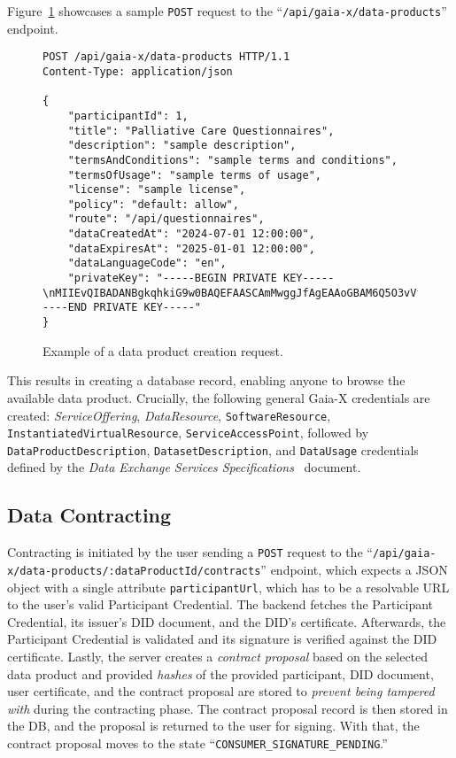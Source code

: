 Figure~\ref{fig:data_products_req} showcases a sample \texttt{POST} request to the ``\texttt{/api/gaia-x/data-products}'' endpoint.

\begin{figure}[h]
    \centering
    \begin{verbatim}
POST /api/gaia-x/data-products HTTP/1.1
Content-Type: application/json

{
	"participantId": 1,
	"title": "Palliative Care Questionnaires",
	"description": "sample description",
	"termsAndConditions": "sample terms and conditions",
	"termsOfUsage": "sample terms of usage",
	"license": "sample license",
	"policy": "default: allow",
	"route": "/api/questionnaires",
	"dataCreatedAt": "2024-07-01 12:00:00",
	"dataExpiresAt": "2025-01-01 12:00:00",
	"dataLanguageCode": "en",
	"privateKey": "-----BEGIN PRIVATE KEY-----\nMIIEvQIBADANBgkqhkiG9w0BAQEFAASCAmMwggJfAgEAAoGBAM6Q5O3vVfnxk6P7\n...\nYWw+HiFJh9XQpRUtv9PV8L8AqFFfMdsOpT6pgC+aA/WB\n-----END PRIVATE KEY-----"
}
    \end{verbatim}
    \caption{Example of a data product creation request.}\label{fig:data_products_req}
\end{figure}

This results in creating a database record, enabling anyone to browse the available data product.
Crucially, the following general Gaia-X credentials are created: \textit{ServiceOffering}, \textit{DataResource}, \texttt{SoftwareResource}, \texttt{InstantiatedVirtualResource}, \texttt{ServiceAccessPoint}, followed by \texttt{DataProductDescription}, \texttt{DatasetDescription}, and \texttt{DataUsage} credentials defined by the \textit{Data Exchange Services Specifications}~\cite{gaiax_data_exchange_document} document.

\subsection{Data Contracting}\label{subsec:data-contracting}

Contracting is initiated by the user sending a \texttt{POST} request to the ``\texttt{/api\-/gaia-x\-/data-products\-/:dataProductId\-/contracts}'' endpoint, which expects a JSON object with a single attribute \texttt{participantUrl}, which has to be a resolvable URL to the user's valid Participant Credential.
The backend fetches the Participant Credential, its issuer's DID document, and the DID's certificate.
Afterwards, the Participant Credential is validated and its signature is verified against the DID certificate.
Lastly, the server creates a \textit{contract proposal} based on the selected data product and provided \textit{hashes} of the provided participant, DID document, user certificate, and the contract proposal are stored to \textit{prevent being tampered with} during the contracting phase.
The contract proposal record is then stored in the DB, and the proposal is returned to the user for signing.
With that, the contract proposal moves to the state ``\texttt{CONSUMER\_SIGNATURE\_PENDING}.''

